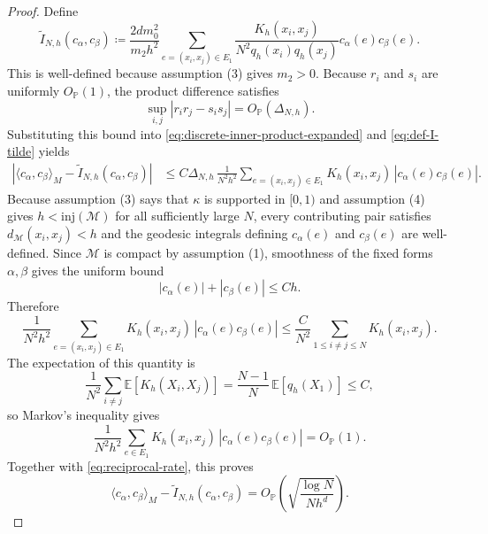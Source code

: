 \documentclass[a4paper,11pt, DIV=10]{scrartcl}
\numberwithin{equation}{section}
\theoremstyle{definition}
\theoremstyle{remark}
\newcommand{\mc}[1]{\mathcal{#1}}
\begin{document}
\begin{proof}
Define
\begin{equation}
\label{eq:def-I-tilde}
\widetilde I_{N,h}(c_\alpha,c_\beta)
\coloneq
\frac{2dm_0^2}{m_2h^2}
\sum_{e=(x_i,x_j)\in E_1}
\frac{K_h(x_i,x_j)}{N^2q_h(x_i)q_h(x_j)}c_\alpha(e)c_\beta(e).
\end{equation}
This is well-defined because assumption \textup{(3)} gives $m_2>0$.
Because $r_i$ and $s_i$ are uniformly $O_{\mathbb P}(1)$, the product difference satisfies
\begin{equation}
\sup_{i,j}|r_ir_j-s_is_j|
=
O_{\mathbb P}(\Delta_{N,h}).
\end{equation}
Substituting this bound into \eqref{eq:discrete-inner-product-expanded} and \eqref{eq:def-I-tilde} yields
\begin{align}
\label{eq:difference-I-Itilde}
\left|\langle c_\alpha,c_\beta\rangle_M-\widetilde I_{N,h}(c_\alpha,c_\beta)\right|
&\le
C\Delta_{N,h}\,
\frac{1}{N^2h^2}
\sum_{e=(x_i,x_j)\in E_1}
K_h(x_i,x_j)\,|c_\alpha(e)c_\beta(e)|.
\end{align}
Because assumption \textup{(3)} says that $\kappa$ is supported in $[0,1)$ and assumption \textup{(4)} gives $h<\mathrm{inj}(\mc{M})$ for all sufficiently large $N$, every contributing pair satisfies $d_{\mc{M}}(x_i,x_j)<h$ and the geodesic integrals defining $c_\alpha(e)$ and $c_\beta(e)$ are well-defined. Since $\mc{M}$ is compact by assumption \textup{(1)}, smoothness of the fixed forms $\alpha,\beta$ gives the uniform bound
\begin{equation}
\label{eq:cochain-size}
|c_\alpha(e)|+|c_\beta(e)|\le Ch.
\end{equation}
Therefore
\begin{equation}
\frac{1}{N^2h^2}
\sum_{e=(x_i,x_j)\in E_1} K_h(x_i,x_j)\,|c_\alpha(e)c_\beta(e)|
\le
\frac{C}{N^2}
\sum_{1\le i\neq j\le N} K_h(x_i,x_j).
\end{equation}
The expectation of this quantity is
\begin{equation}
\frac{1}{N^2}\sum_{i\neq j}\mathbb E[K_h(X_i,X_j)]
=
\frac{N-1}{N}\,\mathbb E[q_h(X_1)]
\le C,
\end{equation}
so Markov's inequality gives
\begin{equation}
\frac{1}{N^2h^2}
\sum_{e\in E_1}K_h(x_i,x_j)\,|c_\alpha(e)c_\beta(e)|
=
O_{\mathbb P}(1).
\end{equation}
Together with \eqref{eq:reciprocal-rate}, this proves
\begin{equation}
\label{eq:reciprocal-replacement-error}
\langle c_\alpha,c_\beta\rangle_M-\widetilde I_{N,h}(c_\alpha,c_\beta)
=
O_{\mathbb P}\!\left(\sqrt{\frac{\log N}{N h^d}}\right).
\end{equation}


\end{proof}
\end{document}
